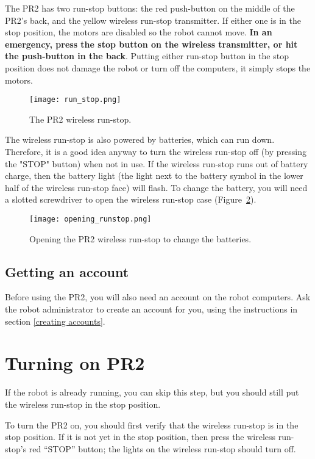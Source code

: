 The PR2 has two run-stop buttons: the red push-button on the middle of the PR2's back, and 
the yellow wireless run-stop transmitter. If either one is in the stop position, the motors are disabled so the
robot cannot move. {\bf In an emergency, press the stop button on the wireless transmitter, or
hit the push-button in the back}. Putting either run-stop button in the stop position does not
damage the robot or turn off the computers, it simply stops the motors.


\begin{figure}[h]
\centering
\texttt{[image: run\_stop.png]}
\caption{The PR2 wireless run-stop.}
\label{fig:runstop}
\end{figure}

The wireless run-stop is also powered by batteries, which can run down.
Therefore, it is a good idea anyway to turn the wireless run-stop off (by pressing the "STOP" button) when not in use.
If the wireless run-stop runs out of battery charge, then the battery light
(the light next to the battery symbol in the lower half of the wireless run-stop face)
will flash. To change the battery, you will need a slotted screwdriver to open
the wireless run-stop case (Figure~\ref{fig:opening-runstop}).

\begin{figure}[!h]
\centering
\texttt{[image: opening\_runstop.png]}
\caption{Opening the PR2 wireless run-stop to change the batteries.}
\label{fig:opening-runstop}
\end{figure}

\subsection{Getting an account}
Before using the PR2, you will also need an account on the robot computers. Ask the robot administrator to create an account for you, using the instructions 
in section \ref{creating accounts}.
\section{Turning on PR2}
If the robot is already running, you can skip this step, but you should still put the wireless run-stop in the stop position. 

To turn the PR2 on, you should first verify that the wireless run-stop is in the stop position. If it is not yet in the stop position, then press the wireless run-stop's red ``STOP'' button; the lights on the wireless run-stop should turn off. 

